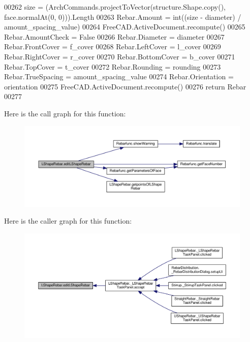 \begin{DoxyCode}
00262         size = (ArchCommands.projectToVector(structure.Shape.copy(), face.normalAt(0, 0))).Length
00263         Rebar.Amount = int((size - diameter) / amount\_spacing\_value)
00264         FreeCAD.ActiveDocument.recompute()
00265         Rebar.AmountCheck = \textcolor{keyword}{False}
00266     Rebar.Diameter = diameter
00267     Rebar.FrontCover = f\_cover
00268     Rebar.LeftCover = l\_cover
00269     Rebar.RightCover = r\_cover
00270     Rebar.BottomCover = b\_cover
00271     Rebar.TopCover = t\_cover
00272     Rebar.Rounding = rounding
00273     Rebar.TrueSpacing = amount\_spacing\_value
00274     Rebar.Orientation = orientation
00275     FreeCAD.ActiveDocument.recompute()
00276     \textcolor{keywordflow}{return} Rebar
00277 
\end{DoxyCode}


Here is the call graph for this function\+:\nopagebreak
\begin{figure}[H]
\begin{center}
\leavevmode
\includegraphics[width=350pt]{namespaceLShapeRebar_a9915291e3457e1c27f556d7903e02486_cgraph}
\end{center}
\end{figure}




Here is the caller graph for this function\+:\nopagebreak
\begin{figure}[H]
\begin{center}
\leavevmode
\includegraphics[width=350pt]{namespaceLShapeRebar_a9915291e3457e1c27f556d7903e02486_icgraph}
\end{center}
\end{figure}


